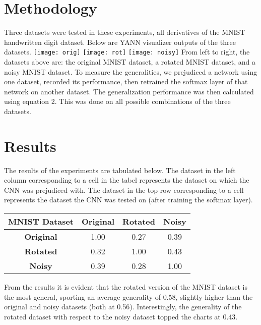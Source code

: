 \documentclass[conference,compsoc]{IEEEtran}
\begin{document}
\section{Methodology}
Three datasets were tested in these experiments, all derivatives of the MNIST handwritten digit dataset. Below are YANN visualizer outputs of the three datasets. 
\texttt{[image: orig]}
\texttt{[image: rot]}
\texttt{[image: noisy]}
From left to right, the datasets above are: the original MNIST dataset, a rotated MNIST dataset, and a noisy MNIST dataset. To measure the generalities, we prejudiced a network using one dataset, recorded its performance, then retrained the softmax layer of that network on another dataset. The generalization performance was then calculated using equation 2. This was done on all possible combinations of the three datasets. 

\section{Results}
The results of the experiments are tabulated below. The dataset in the left column corresponding to a cell in the tabel represents the dataset on which the CNN was prejudiced with. The dataset in the top row corresponding to a cell represents the dataset the CNN was tested on (after training the softmax layer). 
 \renewcommand{\arraystretch}{1.2}
 \begin{center}
   \begin{tabular}{ | c || c | c | c | }
     \hline 
     \textbf{MNIST Dataset} & \textbf{Original} & \textbf{Rotated} & \textbf{Noisy} \\ \hline
     \hline
     \textbf{Original} & 1.00 & 0.27 & 0.39 \\ \hline
     \textbf{Rotated} & 0.32 & 1.00 & 0.43 \\ \hline
     \textbf{Noisy}  & 0.39 & 0.28 & 1.00 \\ \hline
   \end{tabular}
 \end{center}
 
From the results it is evident that the rotated version of the MNIST dataset is the most general, sporting an average generality of 0.58, slightly higher than the original and noisy datasets (both at 0.56). Interestingly, the generality of the rotated dataset with respect to the noisy dataset topped the charts at 0.43. 
\end{document}
